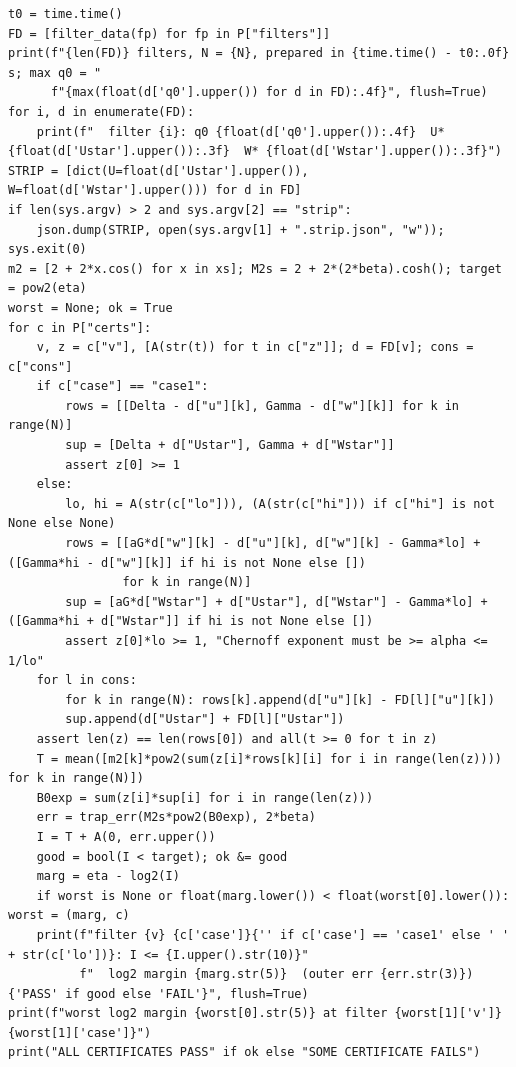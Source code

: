 \documentclass[10pt,a4paper]{article}
\begin{document}
\begin{lstlisting}
t0 = time.time()
FD = [filter_data(fp) for fp in P["filters"]]
print(f"{len(FD)} filters, N = {N}, prepared in {time.time() - t0:.0f} s; max q0 = "
      f"{max(float(d['q0'].upper()) for d in FD):.4f}", flush=True)
for i, d in enumerate(FD):
    print(f"  filter {i}: q0 {float(d['q0'].upper()):.4f}  U* {float(d['Ustar'].upper()):.3f}  W* {float(d['Wstar'].upper()):.3f}")
STRIP = [dict(U=float(d['Ustar'].upper()), W=float(d['Wstar'].upper())) for d in FD]
if len(sys.argv) > 2 and sys.argv[2] == "strip":
    json.dump(STRIP, open(sys.argv[1] + ".strip.json", "w")); sys.exit(0)
m2 = [2 + 2*x.cos() for x in xs]; M2s = 2 + 2*(2*beta).cosh(); target = pow2(eta)
worst = None; ok = True
for c in P["certs"]:
    v, z = c["v"], [A(str(t)) for t in c["z"]]; d = FD[v]; cons = c["cons"]
    if c["case"] == "case1":
        rows = [[Delta - d["u"][k], Gamma - d["w"][k]] for k in range(N)]
        sup = [Delta + d["Ustar"], Gamma + d["Wstar"]]
        assert z[0] >= 1
    else:
        lo, hi = A(str(c["lo"])), (A(str(c["hi"])) if c["hi"] is not None else None)
        rows = [[aG*d["w"][k] - d["u"][k], d["w"][k] - Gamma*lo] + ([Gamma*hi - d["w"][k]] if hi is not None else [])
                for k in range(N)]
        sup = [aG*d["Wstar"] + d["Ustar"], d["Wstar"] - Gamma*lo] + ([Gamma*hi + d["Wstar"]] if hi is not None else [])
        assert z[0]*lo >= 1, "Chernoff exponent must be >= alpha <= 1/lo"
    for l in cons:
        for k in range(N): rows[k].append(d["u"][k] - FD[l]["u"][k])
        sup.append(d["Ustar"] + FD[l]["Ustar"])
    assert len(z) == len(rows[0]) and all(t >= 0 for t in z)
    T = mean([m2[k]*pow2(sum(z[i]*rows[k][i] for i in range(len(z)))) for k in range(N)])
    B0exp = sum(z[i]*sup[i] for i in range(len(z)))
    err = trap_err(M2s*pow2(B0exp), 2*beta)
    I = T + A(0, err.upper())
    good = bool(I < target); ok &= good
    marg = eta - log2(I)
    if worst is None or float(marg.lower()) < float(worst[0].lower()): worst = (marg, c)
    print(f"filter {v} {c['case']}{'' if c['case'] == 'case1' else ' ' + str(c['lo'])}: I <= {I.upper().str(10)}"
          f"  log2 margin {marg.str(5)}  (outer err {err.str(3)}) {'PASS' if good else 'FAIL'}", flush=True)
print(f"worst log2 margin {worst[0].str(5)} at filter {worst[1]['v']} {worst[1]['case']}")
print("ALL CERTIFICATES PASS" if ok else "SOME CERTIFICATE FAILS")
\end{lstlisting}
\end{document}
